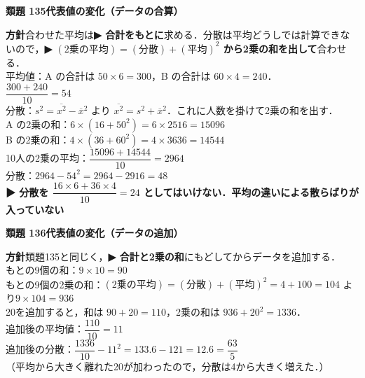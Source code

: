 \documentclass[a4paper,11pt]{ltjsarticle}
\newcommand{\ans}[2]{\Needspace{5\baselineskip}\vspace{6pt}%
  {\sffamily\bfseries 類題 #1\quad #2}\par}
\newcommand{\point}[1]{\textsf{\bfseries ▶ #1}}
\begin{document}
\ans{135}{代表値の変化（データの合算）}
\begin{kai}
\textbf{方針}\quad 合わせた平均は\point{合計をもとに}求める．分散は平均どうしでは計算できないので，\point{$(\text{2乗の平均})=(\text{分散})+(\text{平均})^2$ から2乗の和を出して}合わせる．\\[2pt]
平均値：A の合計は $50\times6=300$，B の合計は $60\times4=240$．\\
\hspace*{1.5em}$\dfrac{300+240}{10}=54$\\[2pt]
分散：$s^2=\overline{x^2}-\overline x^2$ より $\overline{x^2}=s^2+\overline x^2$．これに人数を掛けて2乗の和を出す．\\
\hspace*{1.5em}A の2乗の和：$6\times(16+50^2)=6\times2516=15096$\\
\hspace*{1.5em}B の2乗の和：$4\times(36+60^2)=4\times3636=14544$\\
\hspace*{1.5em}10人の2乗の平均：$\dfrac{15096+14544}{10}=2964$\\
\hspace*{1.5em}分散：$2964-54^2=2964-2916=48$\\
\point{分散を $\dfrac{16\times6+36\times4}{10}=24$ としてはいけない．平均の違いによる散らばりが入っていない}
\end{kai}

\ans{136}{代表値の変化（データの追加）}
\begin{kai}
\textbf{方針}\quad 類題135と同じく，\point{合計と2乗の和}にもどしてからデータを追加する．\\[2pt]
もとの9個の和：$9\times10=90$\\
もとの9個の2乗の和：$(\text{2乗の平均})=(\text{分散})+(\text{平均})^2=4+100=104$ より\quad $9\times104=936$\\[2pt]
20を追加すると，和は $90+20=110$，2乗の和は $936+20^2=1336$．\\
追加後の平均値：$\dfrac{110}{10}=11$\\
追加後の分散：$\dfrac{1336}{10}-11^2=133.6-121=12.6=\dfrac{63}{5}$\\
（平均から大きく離れた20が加わったので，分散は4から大きく増えた．）
\end{kai}
\end{document}

